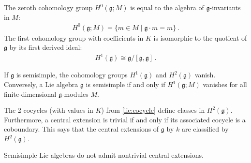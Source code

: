     \begin{property}[$H^0$ and $H^1$]
        The zeroth cohomology group $H^0(\mathfrak{g};M)$ is equal to the algebra of $\mathfrak{g}$-invariants in $M$:
        \begin{gather}
            \label{lie:zeroth_cohomology}
            H^0(\mathfrak{g};M) = \{m\in M\mid\mathfrak{g}\cdot m = m\}\,.
        \end{gather}
        The first cohomology group with coefficients in $K$ is isomorphic to the quotient of $\mathfrak{g}$ by its first derived ideal:
        \begin{gather}
            H^1(\mathfrak{g})\cong\mathfrak{g}/[\mathfrak{g},\mathfrak{g}]\,.
        \end{gather}
    \end{property}

    \begin{property}
        If $\mathfrak{g}$ is semisimple, the cohomology groups $H^1(\mathfrak{g})$ and $H^2(\mathfrak{g})$ vanish. Conversely, a Lie algebra $\mathfrak{g}$ is semisimple if and only if $H^1(\mathfrak{g};M)$ vanishes for all finite-dimensional $\mathfrak{g}$-modules $M$.
    \end{property}

    \begin{property}
        The 2-cocycles (with values in $K$) from \cref{lie:cocycle} define classes in $H^2(\mathfrak{g})$. Furthermore, a central extension is trivial if and only if its associated cocycle is a coboundary. This says that the central extensions of $\mathfrak{g}$ by $k$ are classified by $H^2(\mathfrak{g})$.
    \end{property}
    \begin{result}
        Semisimple Lie algebras do not admit nontrivial central extensions.
    \end{result}


